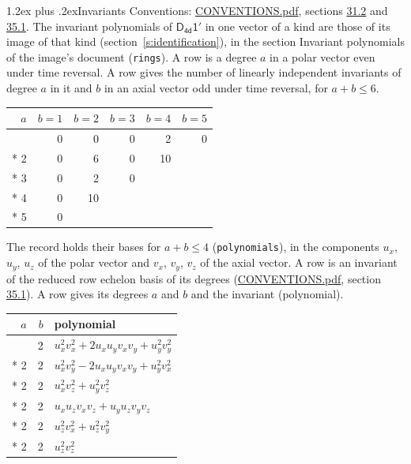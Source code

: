 \documentclass[10pt,a4paper]{article}
\makeatletter
\renewcommand\section{\@startsection{section}{1}{\z@}{-3ex plus -1ex minus -.2ex}%
  {1.2ex plus .2ex}{\normalfont\large\sffamily\bfseries\color{parttitle}}}
\numberwithin{equation}{section}
\newcommand{\grp}[1]{\mathsf{#1}}
\makeatother
\begin{document}
\section{Invariants}\label{s:invariants}
Conventions: \href{../../CONVENTIONS.pdf}{CONVENTIONS.pdf}, sections \href{../../CONVENTIONS.pdf\#conv.31.2}{31.2} and \href{../../CONVENTIONS.pdf\#conv.35.1}{35.1}.
The invariant polynomials of $\grp{D_{4d}1'}$ in one vector of a kind are those of its image of that kind (section~\ref{s:identification}), in the section Invariant polynomials of the image's document (\texttt{rings}).
\leavevmode\label{n:index.degree.polar}\label{n:index.degree.axial}A row is a degree $a$ in a polar vector even under time reversal. A row gives the number of linearly independent invariants of degree $a$ in it and $b$ in an axial vector odd under time reversal, for $a + b \le 6$.
{\small\begin{longtable}{@{}rrrrrr@{}}\toprule
$a$ & $b = 1$ & $b = 2$ & $b = 3$ & $b = 4$ & $b = 5$\\\midrule\endhead
\bottomrule\endfoot\endlastfoot
1 & 0 & 0 & 0 & 2 & 0\\*
2 & 0 & 6 & 0 & 10 & \\*
3 & 0 & 2 & 0 &  & \\*
4 & 0 & 10 &  &  & \\*
5 & 0 &  &  &  & \\
\bottomrule\end{longtable}}
\leavevmode\label{n:local.component.polar}\label{n:local.component.axial}The record holds their bases for $a + b \le 4$ (\texttt{polynomials}), in the components $u_{x}$, $u_{y}$, $u_{z}$ of the polar vector and $v_{x}$, $v_{y}$, $v_{z}$ of the axial vector. \label{n:head.polynomial}A row is an invariant of the reduced row echelon basis of its degrees (\href{../../CONVENTIONS.pdf}{CONVENTIONS.pdf}, section \href{../../CONVENTIONS.pdf\#conv.35.1}{35.1}). A row gives its degrees $a$ and $b$ and the invariant (polynomial).
{\small\renewcommand{\arraystretch}{1.2}\begin{longtable}{@{}rrl@{}}\toprule
$a$ & $b$ & polynomial\\\midrule\endhead
\bottomrule\endfoot\endlastfoot
2 & 2 & $u_{x}^{2}v_{x}^{2} + 2u_{x}u_{y}v_{x}v_{y} + u_{y}^{2}v_{y}^{2}$\\*
2 & 2 & $u_{x}^{2}v_{y}^{2} - 2u_{x}u_{y}v_{x}v_{y} + u_{y}^{2}v_{x}^{2}$\\*
2 & 2 & $u_{x}^{2}v_{z}^{2} + u_{y}^{2}v_{z}^{2}$\\*
2 & 2 & $u_{x}u_{z}v_{x}v_{z} + u_{y}u_{z}v_{y}v_{z}$\\*
2 & 2 & $u_{z}^{2}v_{x}^{2} + u_{z}^{2}v_{y}^{2}$\\*
2 & 2 & $u_{z}^{2}v_{z}^{2}$\\
\bottomrule\end{longtable}}
\end{document}
